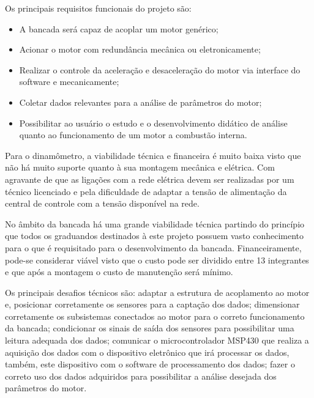 Os principais requisitos funcionais do projeto são:

\begin{itemize}
	\item A bancada será capaz de acoplar um motor genérico;
	\item Acionar o motor com redundância mecânica ou eletronicamente;
	\item Realizar o controle da aceleração e desaceleração do motor via interface do software e mecanicamente;
	\item Coletar dados relevantes para a análise de parâmetros do motor;
	\item Possibilitar ao usuário o estudo e o desenvolvimento didático de análise quanto ao funcionamento de um motor a combustão interna.
\end{itemize}

Para o dinamômetro, a viabilidade técnica e financeira é muito baixa visto que não há muito suporte quanto à sua montagem mecânica e elétrica. Com agravante de que as ligações com a rede elétrica devem ser realizadas por um técnico licenciado e pela dificuldade de adaptar a tensão de alimentação da central de controle com a tensão disponível na rede.

No âmbito da bancada há uma grande viabilidade técnica partindo do princípio que todos os graduandos destinados à este projeto possuem vasto conhecimento para o que é requisitado para o desenvolvimento da bancada. Financeiramente, pode-se considerar viável visto que o custo pode ser dividido entre 13 integrantes e que após a montagem o custo de manutenção será mínimo.

Os principais desafios técnicos são: adaptar a estrutura de acoplamento ao motor e, posicionar corretamente os sensores para a captação dos dados; dimensionar corretamente os subsistemas conectados ao motor para o correto funcionamento da bancada; condicionar os sinais de saída dos sensores para possibilitar uma leitura adequada dos dados; comunicar o microcontrolador MSP430 que realiza a aquisição dos dados com o dispositivo eletrônico que irá processar os dados, também, este dispositivo com o software de processamento dos dados; fazer o correto uso dos dados adquiridos para possibilitar a análise desejada dos parâmetros do motor.
